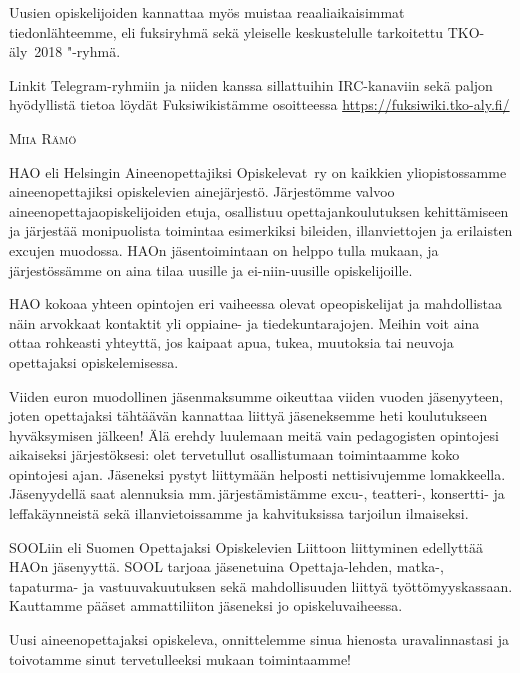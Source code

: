 \documentclass[a5paper, 8pt, twocolumn]{book} %
\numberwithin{equation}{section}
\begin{document}
Uusien opiskelijoiden kannattaa myös
muistaa reaali\-aikaisimmat tiedon\-lähteemme, eli fuksiryhmä
sekä yleiselle keskustelulle tarkoitettu TKO-äly~2018 "-ryhmä.

Linkit Telegram-ryhmiin ja niiden kanssa sillattuihin IRC-kanaviin
sekä paljon hyödyllistä tietoa löydät
Fuksi\-wikistämme osoitteessa \url{https://fuksiwiki.tko-aly.fi/}

\vspace{0.5cm}\noindent\textsc{Miia Rämö}

HAO eli Helsingin Aineenopettajiksi
Opiskelevat~ry on kaikkien yli\-opistossamme
aineenopettajiksi opiskelevien
ainejärjestö. Järjestömme valvoo aineen\-opettaja\-opiskelijoiden
etuja, osallistuu
opettajankoulutuksen kehittämiseen ja järjestää
monipuolista toimintaa esimerkiksi
bileiden, illanviettojen ja erilaisten excujen
muodossa. HAOn jäsentoimintaan on
helppo tulla mukaan, ja järjestössämme on
aina tilaa uusille ja ei-niin-uusille opiskelijoille.

HAO kokoaa yhteen opintojen eri
vaiheessa olevat opeopiskelijat ja mahdollistaa
näin arvokkaat kontaktit yli oppiaine- ja
tiede\-kuntarajojen. Meihin voit aina ottaa
rohkeasti yhteyttä, jos kaipaat apua, tukea,
muutoksia tai neuvoja opettajaksi opiskelemisessa.

Viiden euron muodollinen jäsen\-maksumme
oikeuttaa viiden vuoden jäsenyyteen,
joten opettajaksi tähtäävän kannattaa
liittyä jäseneksemme heti koulutukseen hyväksymisen
jälkeen! Älä erehdy luulemaan
meitä vain pedagogisten opintojesi aikaiseksi
järjestöksesi: olet tervetullut osallistumaan
toimintaamme koko opintojesi
ajan. Jäseneksi pystyt liittymään helposti
nettisivujemme lomakkeella. Jäsenyydellä
saat alennuksia mm.\,järjestämistämme
excu-, teatteri-, konsertti- ja leffakäynneistä
sekä illanvietoissamme ja kahvituksissa
tarjoilun ilmaiseksi.

SOOLiin eli Suomen Opettajaksi Opiskelevien
Liittoon liittyminen edellyttää
HAOn jäsenyyttä. SOOL tarjoaa jäsenetuina
Opettaja-lehden, matka-, tapaturma-
ja vastuuvakuutuksen sekä mahdollisuuden
liittyä työttömyyskassaan.
Kauttamme pääset ammattiliiton jäseneksi
jo opiskeluvaiheessa.

Uusi aineenopettajaksi opiskeleva, onnittelemme
sinua hienosta uravalinnastasi
ja toivotamme sinut tervetulleeksi mukaan
toimintaamme!
\end{document}
